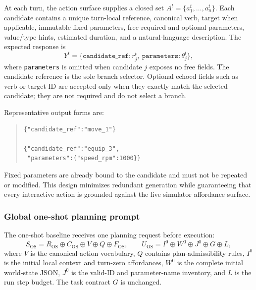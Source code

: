 At each turn, the action surface supplies a closed set
$A^t=\{a_1^t,\ldots,a_n^t\}$. Each candidate contains a unique turn-local
reference, canonical verb, target when applicable, immutable fixed parameters,
free required and optional parameters, value/type hints, estimated duration,
and a natural-language description. The expected response is
\begin{equation}
Y^t = \{\texttt{candidate\_ref}: r_j^t,
        \ \texttt{parameters}: \theta_j^t\},
\end{equation}
where \texttt{parameters} is omitted when candidate $j$ exposes no free
fields. The candidate reference is the sole branch selector. Optional echoed
fields such as verb or target ID are accepted only when they exactly match the
selected candidate; they are not required and do not select a branch.

Representative output forms are:
\begin{quote}
\begin{verbatim}
{"candidate_ref":"move_1"}

{"candidate_ref":"equip_3",
 "parameters":{"speed_rpm":1000}}
\end{verbatim}
\end{quote}
Fixed parameters are already bound to the candidate and must not be repeated or
modified. This design minimizes redundant generation while guaranteeing that
every interactive action is grounded against the live simulator affordance
surface.

\subsubsection{Global one-shot planning prompt}

The one-shot baseline receives one planning request before execution:
\begin{equation}
S_{\mathrm{OS}} = R_{\mathrm{OS}} \oplus C_{\mathrm{OS}}
  \oplus V \oplus Q \oplus F_{\mathrm{OS}},
\qquad
U_{\mathrm{OS}} = I^0 \oplus W^0 \oplus J^0 \oplus G \oplus L,
\label{eq:oneshot_prompt}
\end{equation}
where $V$ is the canonical action vocabulary, $Q$ contains plan-admissibility
rules, $I^0$ is the initial local context and turn-zero affordances, $W^0$ is
the complete initial world-state JSON, $J^0$ is the valid-ID and parameter-name
inventory, and $L$ is the run step budget. The task contract $G$ is unchanged.

